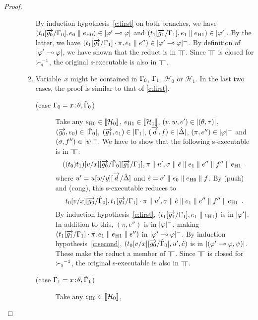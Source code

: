 \begin{proof}
\begin{description}
\begin{enumerate}[label=\textit{(\arabic{*})}]
\[	       \]
	       By induction hypothesis~\ref{c:first} on both branches,
	       we have $(t_0[\overrightarrow{g_0}/\Gamma_0],
	       {e_0\parallel e_{\mathrm{H0}}})\in|{\varphi'\multimap\varphi}|$
	       and
	       $(t_1[\overrightarrow{g_1}/\Gamma_1],{e_1\parallel e_{\mathrm{H1}}})\in|{\varphi'}|$.
	       By the latter, we have $(t_1[\overrightarrow{g_1}/\Gamma_1]\cdot\pi,
	       {e_1}\parallel e'')\in|{\varphi'\multimap\varphi}|^-$.
	       By definition of $|{\varphi'\multimap\varphi}|$, we have shown that the
	       reduct is in $\bbot$.
	       Since $\bbot$ is closed for $\succ_{\mathsf s}^{-1}$,
	       the original s-executable is also in $\bbot$.
	 \item Variable~$x$ might be contained in $\Gamma_0$, $\Gamma_1$,
	       $\mathcal H_0$ or $\mathcal H_1$.
	       In the last two cases, the proof is similar to that of
	       \ref{c:first}.
	       \begin{description}
		\item[(case $\Gamma_0 = {x} \mathord{\colon\kern -2pt}{\theta},\hat{\Gamma}_0$)]
		     Take any
		     $e_{\mathrm{H0}}\in\llbracket{\mathcal H_0}\rrbracket$,
		     $e_{\mathrm{H1}}\in\llbracket{\mathcal H_1}\rrbracket$,
		     $(v,w,e')\in|{(\theta,\tau)}|$,
		     $(\overrightarrow{g_0},{e_0})\in|{\hat{\Gamma}_0}|$,
		     $(\overrightarrow{g_1},{e_1})\in|{\Gamma_1}|$,
		     $(\overrightarrow{d},{f})\in|{\hat{\Delta}}|$,
		     $(\pi,e'')\in|{\varphi}|^-$ and
		     $(\sigma,f'')\in|{\psi}|^-$.
		     We have to show that the following s-executable is in
		     $\bbot$:
		     \[
		     ((t_0)t_1)[v/x][\overrightarrow{g_0}/\hat{\Gamma}_0][\overrightarrow{g_1}/\Gamma_1],\pi\parallel
		     u' ,\sigma\parallel \hat e\parallel {{e_1}}\parallel
		     {e''}\parallel{f''}\parallel e_{\mathrm{H1}}\enspace.
		     \]
		     where
		     $u' = u[w/y][\overrightarrow{d}/\hat{\Delta}]$ and
		     $\hat e= e'\parallel {e_0}\parallel e_{\mathrm{H0}}\parallel {f}$.
		     By (push) and (cong), this s-executable reduces to
		     \[
		     t_0[v/x][\overrightarrow{g_0}/\hat{\Gamma}_0],
		     t_1[\overrightarrow{g_1}/\Gamma_1]\cdot\pi
		     \parallel
		     u' ,\sigma\parallel \hat e\parallel {{e_1}}\parallel
		     {e''}\parallel{f''}\parallel e_{\mathrm{H1}}\enspace.
		     \]
		     By induction hypothesis~\ref{c:first},
		     $(t_1[\overrightarrow{g_1}/\Gamma_1],{e_1\parallel e_{\mathrm{H1}}})$ is in $|{\varphi'}|$.
		     In addition to this, $(\pi,e'')$ is in $|{\varphi}|^-$,
		     making $(t_1[\overrightarrow{g_1}/\Gamma_1]\cdot\pi, {e_1\parallel e_{\mathrm{H1}}}\parallel e'')$ in
		     $|{\varphi'\multimap\varphi}|^-$.
		     By induction hypothesis~\ref{c:second},
		     $(t_0[v/x][\overrightarrow{g_0}/\hat{\Gamma}_0], u', \hat e)$ is in
		     $|{(\varphi'\multimap\varphi,\psi)}|$.
		     These make the reduct a member of $\bbot$.
		     Since $\bbot$ is closed for ${\succ_{\mathsf s}}^{-1}$, the original
		     s-executable is also in $\bbot$.
		\item[(case $\Gamma_1 = {x} \mathord{\colon\kern -2pt}{\theta},\hat{\Gamma}_1$)]
		     Take any
		     $e_{\mathrm{H0}}\in\llbracket{\mathcal H_0}\rrbracket$,

\end{description}
\end{enumerate}
\end{description}
\end{proof}
